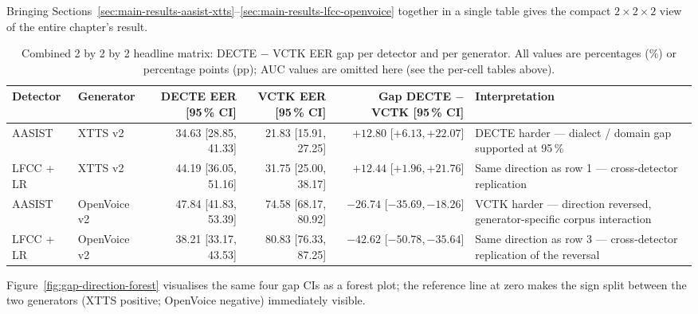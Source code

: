 Bringing Sections~\ref{sec:main-results-aasist-xtts}--\ref{sec:main-results-lfcc-openvoice} together in a single table gives the
compact $2 \times 2 \times 2$ view of the entire chapter's result.

\begin{table}[t]
\centering
\caption{Combined 2 by 2 by 2 headline matrix: DECTE $-$ VCTK EER gap per detector and per generator. All values are percentages (\%) or percentage points (pp); AUC values are omitted here (see the per-cell tables above).}
\label{tab:main-results-combined-matrix}
\scriptsize
\setlength{\tabcolsep}{3pt}
\begin{tabularx}{\linewidth}{@{}l l r r r >{\raggedright\arraybackslash}X@{}}
\toprule
\textbf{Detector} & \textbf{Generator} & \textbf{DECTE EER [95\,\% CI]} & \textbf{VCTK EER [95\,\% CI]} & \textbf{Gap DECTE $-$ VCTK [95\,\% CI]} & \textbf{Interpretation} \\
\midrule
AASIST    & XTTS v2       & 34.63 [28.85, 41.33] & 21.83 [15.91, 27.25] & $\mathbf{+12.80}$ [$+6.13, +22.07$]   & DECTE harder --- dialect / domain gap supported at 95\,\% \\
LFCC + LR & XTTS v2       & 44.19 [36.05, 51.16] & 31.75 [25.00, 38.17] & $\mathbf{+12.44}$ [$+1.96, +21.76$]   & Same direction as row 1 --- cross-detector replication \\
AASIST    & OpenVoice v2  & 47.84 [41.83, 53.39] & 74.58 [68.17, 80.92] & $\mathbf{-26.74}$ [$-35.69, -18.26$]  & VCTK harder --- direction reversed, generator-specific corpus interaction \\
LFCC + LR & OpenVoice v2  & 38.21 [33.17, 43.53] & 80.83 [76.33, 87.25] & $\mathbf{-42.62}$ [$-50.78, -35.64$]  & Same direction as row 3 --- cross-detector replication of the reversal \\
\bottomrule
\end{tabularx}
\end{table}

Figure~\ref{fig:gap-direction-forest} visualises the same four gap CIs
as a forest plot; the reference line at zero makes the sign split
between the two generators (XTTS positive; OpenVoice negative)
immediately visible.

